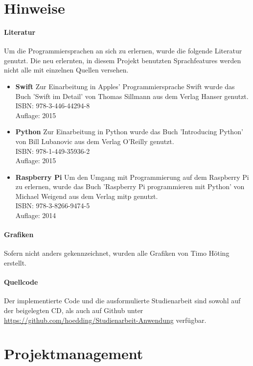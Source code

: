 \section{Hinweise}
\paragraph{Literatur}
Um die Programmiersprachen an sich zu erlernen, wurde die folgende Literatur genutzt. Die neu erlernten, in diesem Projekt benutzten Sprachfeatures werden nicht alle mit einzelnen Quellen versehen. 
\begin{itemize}
	\item \textbf{Swift} Zur Einarbeitung in Apples' Programmiersprache Swift wurde das Buch 'Swift im Detail' von Thomas Sillmann aus dem Verlag Hanser genutzt.\\
	ISBN: 978-3-446-44294-8\\
	Auflage: 2015
	
	\item \textbf{Python} Zur Einarbeitung in Python wurde das Buch 'Introducing Python' von Bill Lubanovic aus dem Verlag O'Reilly genutzt. \\
	ISBN: 978-1-449-35936-2\\
	Auflage: 2015
	
	\item \textbf{Raspberry Pi} Um den Umgang mit Programmierung auf dem Raspberry Pi zu erlernen, wurde das Buch 'Raspberry Pi programmieren mit Python' von Michael Weigend aus dem Verlag mitp genutzt. \\
	ISBN: 978-3-8266-9474-5\\
	Auflage: 2014
\end{itemize}

\paragraph{Grafiken} Sofern nicht anders gekennzeichnet, wurden alle Grafiken von Timo Höting erstellt.

\paragraph{Quellcode} Der implementierte Code und die ausformulierte Studienarbeit sind sowohl auf der beigelegten CD, als auch auf Github unter \url{https://github.com/hoedding/Studienarbeit-Anwendung} verfügbar.

\section{Projektmanagement}

